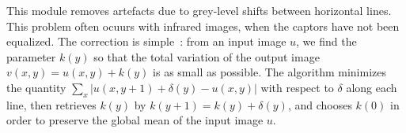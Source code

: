 This module removes artefacts due to grey-level shifts between horizontal lines. This problem often ocuurs with infrared images, when the captors have not been equalized. The correction is simple~: from an input image $u$, we find the parameter $k(y)$ so that the total variation of the output image $v(x,y)=u(x,y)+k(y)$ is as small as possible. The algorithm minimizes the quantity $\sum_x |u(x,y+1)+\delta(y)-u(x,y)|$ with respect to $\delta$ along each line, then retrieves $k(y)$ by $k(y+1)=k(y)+\delta(y)$, and chooses $k(0)$ in order to preserve the global mean of the input image $u$.
